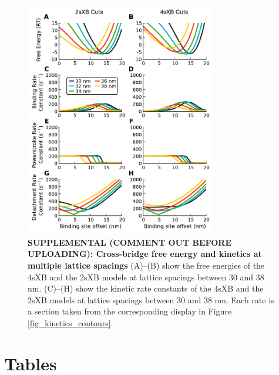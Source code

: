 \documentclass[10pt]{article}
\begin{document}
\begin{figure}[!ht]
    \begin{center}
    \includegraphics[width=8.3cm]{../imgs/fig_multiple_kinetics_cuts.pdf}
    \caption{ \textbf{SUPPLEMENTAL (COMMENT OUT BEFORE UPLOADING): Cross-bridge free energy and kinetics at multiple lattice spacings}
        (A)--(B) show the free energies of the 4sXB and the 2sXB models at lattice spacings between 30 and 38 nm. 
        (C)--(H) show the kinetic rate constants of the 4sXB and the 2sXB models at lattice spacings between 30 and 38 nm.
        Each rate is a section taken from the corresponding display in Figure \ref{fig_kinetics_contours}.
        \label{fig_multiple_kinetics_cuts}
           }
    \end{center}
\end{figure}


\clearpage
\section*{Tables} %
\end{document}
